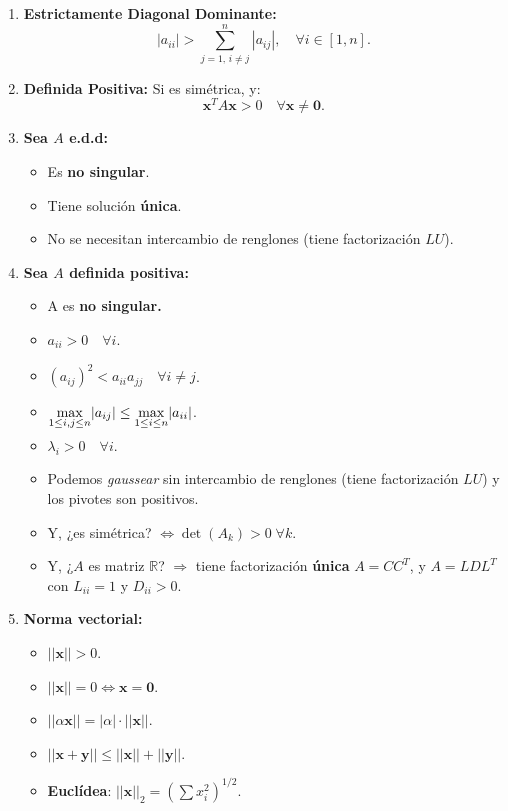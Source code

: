 \documentclass[10pt,a4paper]{article}
\begin{document}
\begin{multicols}{2}
\begin{enumerate}
\begin{itemize}
\end{itemize}
%
\item \textbf{Estrictamente Diagonal Dominante:}
\[|a_{ii}|>\sum_{j=1, \, i\neq j}^n |a_{ij}|, \quad \forall i \in [1,n].\]
%
\item \textbf{Definida Positiva:} Si es simétrica, y:
\[\mathbf{x}^T A \mathbf{x} > 0 \quad \forall \mathbf{x} \neq \mathbf{0}.\]
%
\item \textbf{Sea $A$ e.d.d:}
\begin{itemize}
\item Es \textbf{no singular}.
\item Tiene solución \textbf{única}.
\item No se necesitan intercambio de renglones (tiene factorización $LU$).
\end{itemize}
%
\columnbreak
\vfill
\item \textbf{Sea $A$ definida positiva:}
\begin{itemize}
\item A es \textbf{no singular.}
\item $a_{ii} >0 \quad \forall i$.
\item $(a_{ij})^2 < a_{ii} a_{jj} \quad \forall i \neq j$.
\item $\smash{\displaystyle\max_{1\leq i,j \leq n}} |a_{ij}| \leq \smash{\displaystyle\max_{1\leq i \leq n}} |a_{ii}|$.
\\
\item $\lambda_{i}>0 \quad \forall i$.
\item Podemos \textit{gaussear} sin intercambio de renglones (tiene factorización $LU$) y los pivotes son positivos.
\item Y, ¿es simétrica? $\iff \det(A_k) >0 \; \forall k$.
\item Y, ¿$A$ es matriz $\mathbb{R}$? $\Rightarrow$ tiene factorización \textbf{única} $A = CC^T$, y $A=LDL^T$ con $L_{ii} =1$ y $D_{ii}>0$.
\end{itemize}
%
\item \textbf{Norma vectorial:}
\begin{itemize}
\item $||\mathbf{x}||>0$.
\item $||\mathbf{x}||=0 \iff \mathbf{x}=\mathbf{0}$.
\item $||\alpha \mathbf{x}|| = |\alpha | \cdot ||\mathbf{x}||$.
\item $||\mathbf{x}+\mathbf{y}|| \leq ||\mathbf{x}||+||\mathbf{y}||$. 
\\
\item \textbf{Euclídea}: $||\mathbf{x}||_2 = \left(\sum x_i^2\right)^{1/2}$.

\end{itemize}
\end{enumerate}
\end{multicols}
\end{document}
